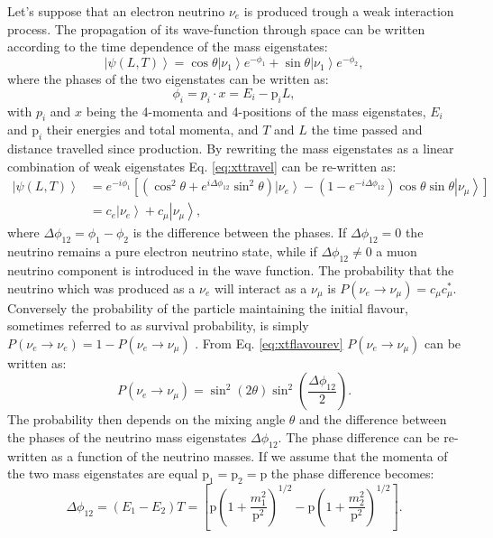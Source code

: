 Let's suppose that an electron neutrino $\nu_e$ is produced trough a weak interaction process. The propagation of its wave-function through space can be written according to the time dependence of the mass eigenstates:
\begin{equation}
\label{eq:xttravel}
    \left| \psi(L,T)\right\rangle = \cos\theta \left|\nu_1\right\rangle e^{-\phi_1}+ \sin\theta \left|\nu_1\right\rangle e^{-\phi_2} ,
\end{equation}
where the phases of the two eigenstates can be written as: 
\begin{equation}
    \phi_i = p_i\cdot x = E_i-\text{p}_i L ,
\end{equation}
with $p_i$ and $x$ being the 4-momenta and 4-positions of the mass eigenstates, $E_i$ and $\text{p}_i$  their energies and total momenta, and $T$ and $L$ the time passed and distance travelled since production.  By rewriting the mass eigenstates as a linear combination of weak eigenstates Eq. \ref{eq:xttravel} can be re-written as:
\begin{equation}
\label{eq:xtflavourev}
    \begin{aligned}
        \left| \psi(L,T)\right\rangle & = e^{-i\phi_1} [ (\cos^2\theta+e^{i\Delta \phi_{12}}\sin^2\theta) \left|\nu_e\right\rangle 
        - (1-e^{-i\Delta\phi_{12}})\cos\theta\sin\theta \left|\nu_\mu\right\rangle] \\
        &=c_e\left|\nu_e\right\rangle + c_\mu\left|\nu_\mu\right\rangle ,
    \end{aligned}
\end{equation}
where $\Delta \phi_{12} = \phi_1 - \phi_2$ is the difference between the phases. If $\Delta\phi_{12}=0$ the neutrino remains a pure electron neutrino state, while if $\Delta\phi_{12}\neq0$ a muon neutrino component is introduced in the wave function. The probability that the neutrino which was produced as a $\nu_e$ will interact as a $\nu_\mu$ is $P(\nu_e \rightarrow \nu_\mu)=c_\mu c_\mu^*$.  Conversely the probability of the particle maintaining the initial flavour, sometimes referred to as survival probability, is simply $P(\nu_e\rightarrow \nu_e)=1-P(\nu_e \rightarrow \nu_\mu)$ . From Eq. \ref{eq:xtflavourev} $P(\nu_e \rightarrow \nu_\mu)$ can be written as:
\begin{equation}
\label{eq:2fOscprob1}
    P(\nu_e\rightarrow\nu_\mu) = \sin^2(2\theta)\sin^2\left(\frac{\Delta\phi_{12}}{2}\right) .
\end{equation}
The probability then depends on the mixing angle $\theta$ and the difference between the phases of the neutrino mass eigenstates $\Delta\phi_{12}$. The phase difference can be re-written as a function of the neutrino masses. If we assume that the momenta of the two mass eigenstates are equal $\text{p}_1 = \text{p}_2 = \text{p}$ the phase difference becomes:
\begin{equation}
    \Delta\phi_{12}=(E_1-E_2)T=\left[\text{p}\left(1+\frac{m_1^2}{\text{p}^2}\right)^{1/2}-\text{p}\left(1+\frac{m_2^2}{\text{p}^2}\right)^{1/2}\right] .
\end{equation}


